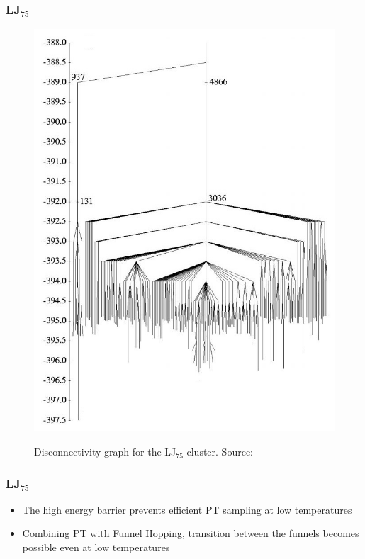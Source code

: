 \documentclass{beamer}
\begin{document}
	\begin{frame}
		\frametitle{LJ$_{75}$}
		\begin{figure}
			\center
			\includegraphics[height=0.85\textheight]{figures/LJ75_disc.jpg}
			\label{fig:LJ38_disc}
			\caption{Disconnectivity graph for the LJ$_{75}$ cluster. Source: \cite{Doye1999}}
		\end{figure}
	\end{frame}
 	
 	\begin{frame}
 		\frametitle{LJ$_{75}$}
 		\begin{itemize}
 			\item The high energy barrier prevents efficient PT sampling at low temperatures
 			\item Combining PT with Funnel Hopping, transition between the funnels becomes possible even at low temperatures

 		\end{itemize}

 	\end{frame}
\end{document}

